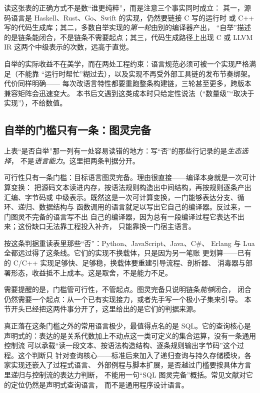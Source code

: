 \documentclass[12pt,a4paper,fontset=fandol]{ctexbook}
\newcommand{\Lang}[1]{\textsf{#1}}
\newcommand{\CL}{\Lang{C}}
\newcommand{\CPP}{\Lang{C++}}
\newcommand{\Mx}[1]{\textsf{#1}}
\begin{document}
读这张表的正确方式不是数“谁更纯粹”，而是注意三个事实同时成立：
其一，源码语言是 \Mx{Haskell}、\Mx{Rust}、\Mx{Go}、\Mx{Swift} 的实现，仍然要链接 \CL{} 写的运行时
或 \CPP{} 写的代码生成库；其二，多数自举实现的\emph{第一轮}由别的编译器产出，
“自举”描述的是链条能闭合，不是链条不需要起点；其三，代码生成路径上出现 \CL{} 或 LLVM IR
这两个中级表示的次数，远高于直觉。

自举的实际收益不在美学，而在两处工程约束：语言规范必须可被一个实现严格满足（不能靠
“运行时帮忙”糊过去），以及实现不再受外部工具链的发布节奏绑架。代价同样明确——
每次改语言特性都要重跑整条构建链，三轮甚至更多，跨版本兼容矩阵会迅速变大。
本书后文遇到这类成本时只给定性说法（“数量级”“取决于实现”），不给数值。

\subsection{自举的门槛只有一条：图灵完备}\label{sec:cl01-carrier-tc}

上表“是否自举”那一列有一处容易读错的地方：写“否”的那些行记录的是\emph{生态选择}，
不是\emph{语言能力}。这里把两条判据分开。

可行性只有一条门槛：目标语言图灵完备。理由很直接——编译本身就是一次可计算变换：
把源码文本读进内存，按语法规则构造出中间结构，再按规则逐条产出汇编、字节码或
中级表示。既然这是一次可计算变换，一门能够表达分支、循环、递归、数据结构与
函数调用的语言就足以写出它自己的编译器。反过来，一门图灵不完备的语言写不出
自己的编译器，因为总有一段编译过程它表达不出来；这份缺口无法靠工程投入补齐，
只能靠换一门宿主语言。

按这条判据重读表里那些“否”：\Mx{Python}、\Lang{JavaScript}、\Mx{Java}、\Mx{C\#}、
\Mx{Erlang} 与 \Mx{Lua} 全都远过得了这条线。它们的实现不换载体，只是因为另一笔账
更划算——已有的 \CL{}/\CPP{} 实现足够快、足够稳，换载体要重建引导流程、剖析器、
消毒器与部署形态，收益抵不上成本。这是取舍，不是能力不足。

需要提醒的是，门槛管可行性，不管起点。图灵完备只说明链条\emph{能够}闭合，
闭合仍然需要一个起点：从一个已有实现接力，或者先手写一个极小子集来引导。
本节开头已经把这两件事分开了，这里给出的是它们的判据来源。

真正落在这条门槛之外的常用语言极少，最值得点名的是 \Mx{SQL}。它的查询核心是
声明式的：表达的是关系代数加上不动点这一类可定义的集合运算，没有一条通用控制流
可以承载“读一段文本、按语法构造结构、逐条规则输出字节码”这个过程。这个判断只
针对查询核心——标准后来加入了递归查询与持久存储模块，各家实现还嵌入了过程式语言、
外部例程与脚本扩展，是否越过门槛要按具体方言里递归与控制流的表达力判断，
不能用一句“\Mx{SQL} 图灵完备”概括。常见文献对它的定位仍然是声明式查询语言，
而不是通用程序设计语言。
\end{document}
